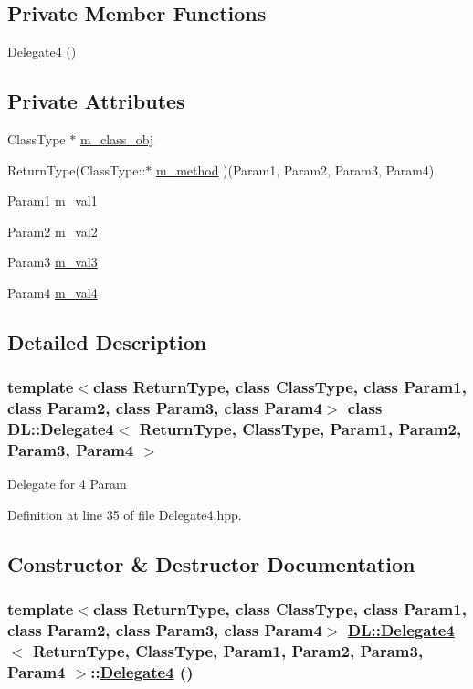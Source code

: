 \subsection*{Private Member Functions}
\begin{CompactItemize}
\item 
\hyperlink{classDL_1_1Delegate4_d0}{Delegate4} ()
\end{CompactItemize}
\subsection*{Private Attributes}
\begin{CompactItemize}
\item 
Class\-Type $\ast$ \hyperlink{classDL_1_1Delegate4_r0}{m\_\-class\_\-obj}
\item 
Return\-Type(Class\-Type::$\ast$ \hyperlink{classDL_1_1Delegate4_r1}{m\_\-method} )(Param1, Param2, Param3, Param4)
\item 
Param1 \hyperlink{classDL_1_1Delegate4_r2}{m\_\-val1}
\item 
Param2 \hyperlink{classDL_1_1Delegate4_r3}{m\_\-val2}
\item 
Param3 \hyperlink{classDL_1_1Delegate4_r4}{m\_\-val3}
\item 
Param4 \hyperlink{classDL_1_1Delegate4_r5}{m\_\-val4}
\end{CompactItemize}


\subsection{Detailed Description}
\subsubsection*{template$<$class Return\-Type, class Class\-Type, class Param1, class Param2, class Param3, class Param4$>$ class DL::Delegate4$<$ Return\-Type, Class\-Type, Param1, Param2, Param3, Param4 $>$}

Delegate for 4 Param



Definition at line 35 of file Delegate4.hpp.

\subsection{Constructor \& Destructor Documentation}
\hypertarget{classDL_1_1Delegate4_d0}{
\subsubsection[Delegate4]{\setlength{\rightskip}{0pt plus 5cm}template$<$class Return\-Type, class Class\-Type, class Param1, class Param2, class Param3, class Param4$>$ \hyperlink{classDL_1_1Delegate4}{DL::Delegate4}$<$ Return\-Type, Class\-Type, Param1, Param2, Param3, Param4 $>$::\hyperlink{classDL_1_1Delegate4}{Delegate4} ()}}
\label{classDL_1_1Delegate4_d0}




